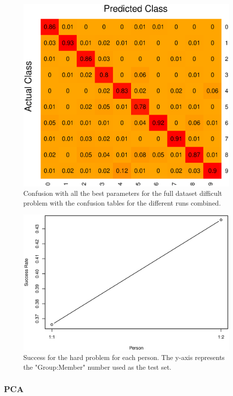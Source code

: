 \begin{figure}[H]
\centering
\includegraphics[width = 0.7 \textwidth]{graphics/knn_confusion_bestparam_hard}
\caption{Confusion with all the best parameters for the full dataset difficult problem with the confusion tables for the different runs combined.}
\label{fig:knn_conf_final_hard}
\end{figure}


\begin{figure}[H]
\centering
\includegraphics[width = 0.95 \textwidth]{graphics/knn_final_full_hard}
\caption{Success for the hard problem for each person.
The y-axis represents the "Group:Member" number used as the test set.}
\label{fig:knn_succ_final_hard}
\end{figure}





\subsubsection{PCA}

